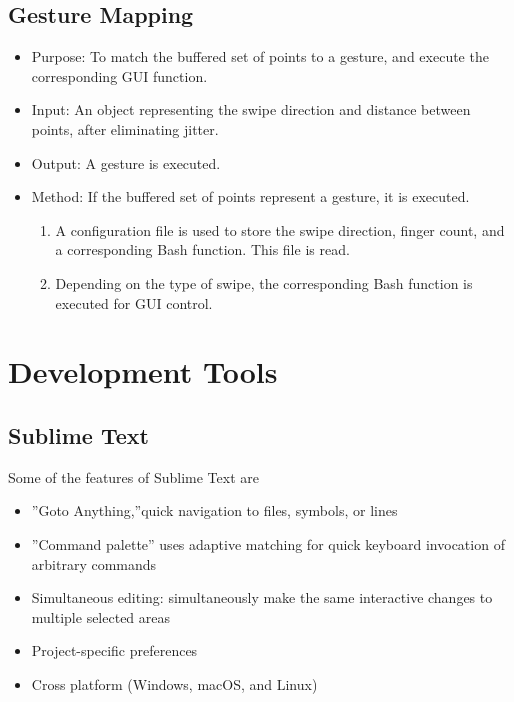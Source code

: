 \documentclass[11pt]{report}
\begin{document}
\subsection{Gesture Mapping}
\begin{itemize}
    \item Purpose: To match the buffered set of points to a gesture, and execute the corresponding GUI function.
    \item Input: An object representing the swipe direction and distance between points, after eliminating jitter.
    \item Output: A gesture is executed.
    \item Method: If the buffered set of points represent a gesture, it is executed.
    \begin{enumerate}
        \item A configuration file is used to store the swipe direction, finger count, and a corresponding Bash function. This file is read.
        \item Depending on the type of swipe, the corresponding Bash function is executed for GUI control.
    \end{enumerate}
\end{itemize}
\section{Development Tools}
\subsection{Sublime Text}
Some of the features of Sublime Text are
\begin{itemize}
\item ”Goto Anything,”quick navigation to files, symbols, or lines
\item ”Command palette” uses adaptive matching for quick keyboard invocation of arbitrary commands
\item Simultaneous editing: simultaneously make the same interactive changes to multiple selected
areas

\item Project-specific preferences

\item Cross platform (Windows, macOS, and Linux)

\end{itemize}
\end{document}
